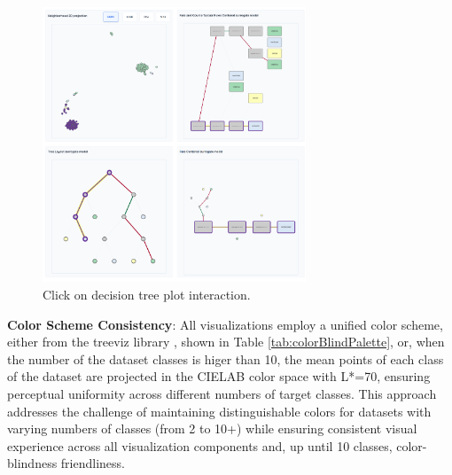 \begin{figure}[ht]
  \centering
  \includegraphics[width=0.7\textwidth]{images/FullInterfaceFinalLeadInteraction.png}
  \caption{Click on decision tree plot interaction.}
  \label{fig:finalTotalTreeLeafClick}
\end{figure}

\textbf{Color Scheme Consistency}: All visualizations employ a unified color scheme, either from the treeviz library \cite{parr2019dtreeviz}, shown in Table \ref{tab:colorBlindPalette}, or, when the number of the dataset classes is higer than 10, the mean points of each class of the dataset are projected in the CIELAB color space with L*=70, ensuring perceptual uniformity across different numbers of target classes. This approach addresses the challenge of maintaining distinguishable colors for datasets with varying numbers of classes (from 2 to 10+) while ensuring consistent visual experience across all visualization components and, up until 10 classes, color-blindness friendliness. 


